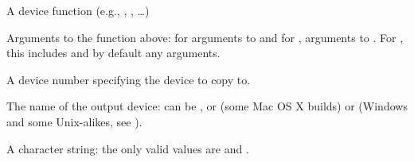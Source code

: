 \begin{Arguments}
\begin{ldescription}
\item[\code{device}] A device function (e.g., ,
, \ldots)
\item[\code{...}] Arguments to the  function above: for
 arguments to  and for
, arguments to .
For , this includes  and by default any
 arguments.
\item[\code{which}] A device number specifying the device to copy to.
\item[\code{out.type}] The name of the output device: can be , or
 (some Mac OS X builds) or  (Windows
and some Unix-alikes, see ).
\item[\code{displaylist}] A character string: the only valid values are
 and .
\end{ldescription}
\end{Arguments}
%
